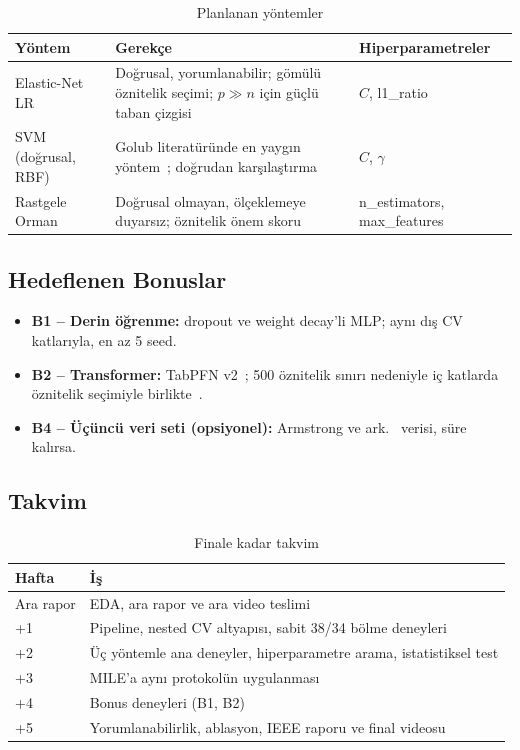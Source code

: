 \documentclass[conference]{IEEEtran}
\begin{document}
\begin{table}[htbp]
\caption{Planlanan yöntemler}
\label{tab:yontem}
\centering
\footnotesize
\begin{tabularx}{\columnwidth}{@{}l L l@{}}
\toprule
Yöntem & Gerekçe & Hiperparametreler \\
\midrule
Elastic-Net LR & Doğrusal, yorumlanabilir; gömülü öznitelik seçimi; $p \gg n$ için güçlü taban çizgisi & $C$, l1\_ratio \\
SVM (doğrusal, RBF) & Golub literatüründe en yaygın yöntem~\cite{furey2000,guyon2002}; doğrudan karşılaştırma & $C$, $\gamma$ \\
Rastgele Orman & Doğrusal olmayan, ölçeklemeye duyarsız; öznitelik önem skoru~\cite{diaz2006} & n\_estimators, max\_features \\
\bottomrule
\end{tabularx}
\end{table}

\subsection{Hedeflenen Bonuslar}
\begin{itemize}[leftmargin=*]
  \item \textbf{B1 -- Derin öğrenme:} dropout ve weight decay'li MLP; aynı dış CV katlarıyla, en az 5 seed.
  \item \textbf{B2 -- Transformer:} TabPFN v2~\cite{hollmann2025}; 500 öznitelik sınırı nedeniyle iç katlarda öznitelik seçimiyle birlikte~\cite{zhou2025}.
  \item \textbf{B4 -- Üçüncü veri seti (opsiyonel):} Armstrong ve ark.~\cite{armstrong2002} verisi, süre kalırsa.
\end{itemize}

\subsection{Takvim}
\begin{table}[htbp]
\caption{Finale kadar takvim}
\centering
\footnotesize
\begin{tabularx}{\columnwidth}{@{}l L@{}}
\toprule
Hafta & İş \\
\midrule
Ara rapor & EDA, ara rapor ve ara video teslimi \\
+1 & Pipeline, nested CV altyapısı, sabit 38/34 bölme deneyleri \\
+2 & Üç yöntemle ana deneyler, hiperparametre arama, istatistiksel test \\
+3 & MILE'a aynı protokolün uygulanması \\
+4 & Bonus deneyleri (B1, B2) \\
+5 & Yorumlanabilirlik, ablasyon, IEEE raporu ve final videosu \\
\bottomrule
\end{tabularx}
\end{table}
\end{document}
